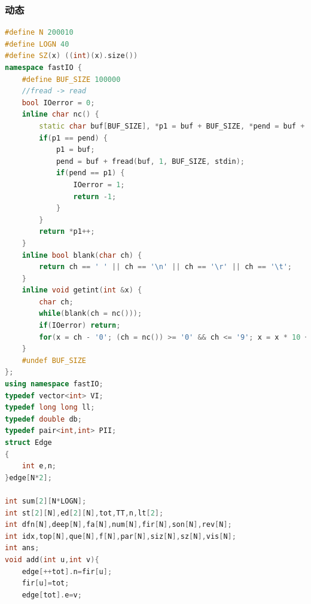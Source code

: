 \documentclass[UTF8,a4paper,titlepage]{ctexart}
\begin{document}
\subsubsection{动态}
\begin{lstlisting}[language=C++]
#define N 200010
#define LOGN 40
#define SZ(x) ((int)(x).size())
namespace fastIO {
    #define BUF_SIZE 100000
    //fread -> read
    bool IOerror = 0;
    inline char nc() {
        static char buf[BUF_SIZE], *p1 = buf + BUF_SIZE, *pend = buf + BUF_SIZE;
        if(p1 == pend) {
            p1 = buf;
            pend = buf + fread(buf, 1, BUF_SIZE, stdin);
            if(pend == p1) {
                IOerror = 1;
                return -1;
            }
        }
        return *p1++;
    }
    inline bool blank(char ch) {
        return ch == ' ' || ch == '\n' || ch == '\r' || ch == '\t';
    }
    inline void getint(int &x) {
        char ch;
        while(blank(ch = nc()));
        if(IOerror) return;
        for(x = ch - '0'; (ch = nc()) >= '0' && ch <= '9'; x = x * 10 + ch - '0');
    }
    #undef BUF_SIZE
};
using namespace fastIO;
typedef vector<int> VI;
typedef long long ll;
typedef double db;
typedef pair<int,int> PII;
struct Edge
{
    int e,n;
}edge[N*2];

int sum[2][N*LOGN];
int st[2][N],ed[2][N],tot,TT,n,lt[2];
int dfn[N],deep[N],fa[N],num[N],fir[N],son[N],rev[N];
int idx,top[N],que[N],f[N],par[N],siz[N],sz[N],vis[N];
int ans;
void add(int u,int v){
    edge[++tot].n=fir[u];
    fir[u]=tot;
    edge[tot].e=v;


\end{lstlisting}
\end{document}
